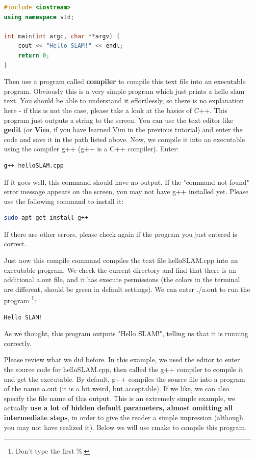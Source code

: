 \begin{lstlisting}[language=C++,caption=slambook2/ch2/helloSLAM.cpp]
#include <iostream>
using namespace std;

int main(int argc, char **argv) {
    cout << "Hello SLAM!" << endl;
    return 0;
}
\end{lstlisting}

Then use a program called \textbf{compiler} to compile this text file into an executable program. Obviously this is a very simple program which just prints a hello slam text. You should be able to understand it effortlessly, so there is no explanation here - if this is not the case, please take a look at the basics of C++. This program just outputs a string to the screen. You can use the text editor like \textbf{gedit} (or \textbf{Vim}, if you have learned Vim in the previous tutorial) and enter the code and save it in the path listed above. Now, we compile it into an executable using the compiler g++ (g++ is a C++ compiler). Enter:

\begin{lstlisting}[language=sh,caption=Terminal input:]
g++ helloSLAM.cpp
\end{lstlisting}

If it goes well, this command should have no output. If the "command not found" error message appears on the screen, you may not have g++ installed yet. Please use the following command to install it:
\begin{lstlisting}[language=sh,caption=terminal input:]
sudo apt-get install g++
\end{lstlisting}
If there are other errors, please check again if the program you just entered is correct.

Just now this compile command compiles the text file helloSLAM.cpp into an executable program. We check the current directory and find that there is an additional a.out file, and it has execute permissions (the colors in the terminal are different, should be green in default settings). We can enter ./a.out to run the program \footnote{Don't type the first \%. }:

\begin{lstlisting}[language=sh,caption=terminal input:]
% ./a.out
Hello SLAM!
\end{lstlisting}

As we thought, this program outputs "Hello SLAM!", telling us that it is running correctly.

Please review what we did before. In this example, we used the editor to enter the source code for helloSLAM.cpp, then called the g++ compiler to compile it and get the executable. By default, g++ compiles the source file into a program of the name a.out (it is a bit weird, but acceptable). If we like, we can also specify the file name of this output. This is an extremely simple example, we actually \textbf{use a lot of hidden default parameters, almost omitting all intermediate steps}, in order to give the reader a simple impression (although you may not have realized it). Below we will use cmake to compile this program.

